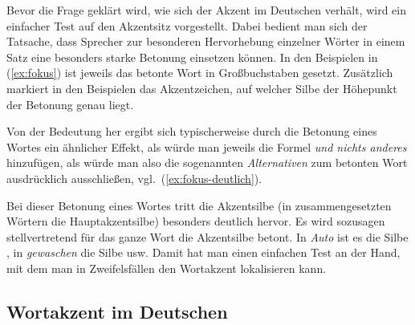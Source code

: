 \begin{exe}
\end{exe}

Bevor die Frage geklärt wird, wie sich der Akzent im Deutschen verhält, wird ein einfacher Test auf den Akzentsitz vorgestellt.
Dabei bedient man sich der Tatsache, dass Sprecher zur besonderen Hervorhebung einzelner Wörter in einem Satz eine besonders starke Betonung einsetzen können.
In den Beispielen in (\ref{ex:fokus}) ist jeweils das betonte Wort in Großbuchstaben gesetzt.
Zusätzlich markiert in den Beispielen das Akzentzeichen, auf welcher Silbe der Höhepunkt der Betonung genau liegt.

\begin{exe}
  \ex\label{ex:fokus}
  \begin{xlist}
  \end{xlist}
\end{exe}

Von der Bedeutung her ergibt sich typischerweise durch die Betonung eines Wortes ein ähnlicher Effekt, als würde man jeweils die Formel \textit{und nichts anderes} hinzufügen, als würde man also die sogenannten \textit{Alternativen} zum betonten Wort ausdrücklich ausschließen, vgl.\ (\ref{ex:fokus-deutlich}).

\begin{exe}
  \ex\label{ex:fokus-deutlich}
  \begin{xlist}
  \end{xlist}
\end{exe}

Bei dieser Betonung eines Wortes tritt die Akzentsilbe (in zusammengesetzten Wörtern die Hauptakzentsilbe) besonders deutlich hervor.
Es wird sozusagen stellvertretend für das ganze Wort die Akzentsilbe betont.
In \textit{Auto} ist es die Silbe \textipa{[\t{aO}]}, in \textit{gewaschen} die Silbe \textipa{[va]} usw.
Damit hat man einen einfachen Test an der Hand, mit dem man in Zweifelsfällen den Wortakzent lokalisieren kann.

\subsection{Wortakzent im Deutschen}

\label{sec:wortakzentimdeutschen}

